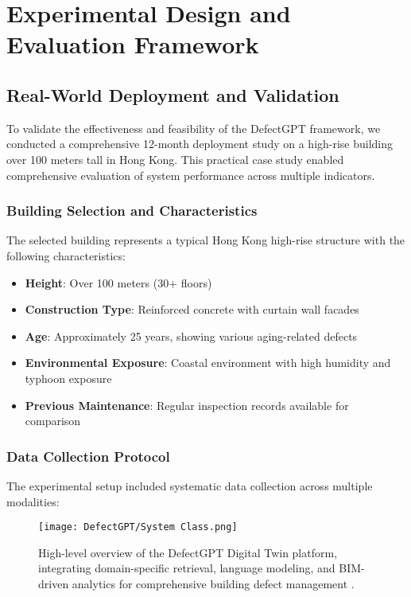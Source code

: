 \section{Experimental Design and Evaluation Framework}

\subsection{Real-World Deployment and Validation}

To validate the effectiveness and feasibility of the DefectGPT framework, we conducted a comprehensive 12-month deployment study on a high-rise building over 100 meters tall in Hong Kong. This practical case study enabled comprehensive evaluation of system performance across multiple indicators.

\subsubsection{Building Selection and Characteristics}

The selected building represents a typical Hong Kong high-rise structure with the following characteristics:

\begin{itemize}
    \item \textbf{Height}: Over 100 meters (30+ floors)
    \item \textbf{Construction Type}: Reinforced concrete with curtain wall facades
    \item \textbf{Age}: Approximately 25 years, showing various aging-related defects
    \item \textbf{Environmental Exposure}: Coastal environment with high humidity and typhoon exposure
    \item \textbf{Previous Maintenance}: Regular inspection records available for comparison
\end{itemize}

\subsubsection{Data Collection Protocol}

The experimental setup included systematic data collection across multiple modalities:

\begin{figure}[htbp]
    \centering
    \texttt{[image: DefectGPT/System Class.png]}
    \caption{High-level overview of the DefectGPT Digital Twin platform, integrating domain-specific retrieval, language modeling, and BIM-driven analytics for comprehensive building defect management \cite{zhang2024automated}.}
    \label{fig:system-overview}
\end{figure}

